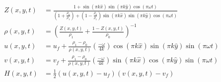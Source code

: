 \documentclass[11pt]{book}
\begin{document}
\begin{align}
\label{eqn_mms_z} Z(x,y,t) &= \frac{1 + \sin(\pi k \hat{x}) \sin(\pi k \hat{y}) \cos(\pi \omega t)}{(1 + \frac{\rho_0}{\rho_1}) + (1 - \frac{\rho_0}{\rho_1}) \sin(\pi k \hat{x}) \sin(\pi k \hat{y}) \cos(\pi \omega t)} \\
\label{eqn_mms_rho} \rho(x,y,t) &= \left( \frac{Z(x,y,t)}{\rho_1} + \frac{1-Z(x,y,t)}{\rho_0} \right)^{-1} \\
\label{eqn_mms_u} u(x,y,t) &= u_f + \frac{\rho_1 - \rho_0}{\rho(x,y,t)} \left(\frac{-\omega}{4 k}\right) \cos(\pi k \hat{x}) \sin(\pi k \hat{y}) \sin(\pi \omega t) \\
\label{eqn_mms_v} v(x,y,t) &= v_f + \frac{\rho_1 - \rho_0}{\rho(x,y,t)} \left(\frac{-\omega}{4 k}\right) \sin(\pi k \hat{x}) \cos(\pi k \hat{y}) \sin(\pi \omega t) \\
\label{eqn_mms_p} H(x,y,t) &= \frac{1}{2} ( u(x,y,t) - u_f ) ( v(x,y,t) - v_f )
\end{align}

\end{document}
